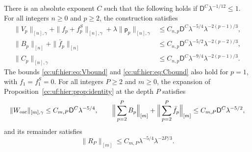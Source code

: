 \begin{theorem}\label{cc:uf:hier:thm:depth}
There is an absolute exponent $C$ such that the following holds if
$\mathsf D^C\lambda^{-1/12}\le1$. For all integers \(n\ge0\) and
\(p\ge2\), the construction satisfies
\begin{align}
 \|V_p\|_{[n],\gamma}+\|f_p+f_p^S\|_{[n],\gamma}
        +\lambda\|\mathsf p_p\|_{[n],\gamma}
 &\le C_{n,p}\mathsf D^C\lambda^{-5/4}\lambda^{-2(p-1)/3},
 \label{cc:uf:hier:eq:Vbound}\\
 \|B_p\|_{[n]}+\|\bar f_p\|_{[n]}
 &\le C_{n,p}\mathsf D^C\lambda^{-5/2}\lambda^{-2(p-2)/3},
 \label{cc:uf:hier:eq:Bbound}\\
 \|C_p\|_{[n],\gamma}
 &\le C_{n,p}\mathsf D^C\lambda^{-9/4}\lambda^{-2(p-1)/3}.
 \label{cc:uf:hier:eq:Cbound}
\end{align}
The bounds \eqref{cc:uf:hier:eq:Vbound} and
\eqref{cc:uf:hier:eq:Cbound} also hold for $p=1$, with $f_1=f_1^S=0$.
For all integers \(P\ge2\) and \(m\ge0\), the expansion of
Proposition~\ref{cc:uf:hier:prop:identity} at the depth $P$ satisfies
\begin{equation}\label{cc:uf:hier:eq:sum}
 \|W_{\rm osc}\|_{[m],\gamma}\le C_{m,P}\mathsf D^C\lambda^{-5/4},\qquad
 \Big\|\sum_{p=2}^PB_p\Big\|_{[m]}+\Big\|\sum_{p=2}^P\bar f_p\Big\|_{[m]}
 \le C_{m,P}\mathsf D^C\lambda^{-5/2},
\end{equation}
and its remainder satisfies
\begin{equation}\label{cc:uf:hier:eq:tail-est}
 \|R_P\|_{[m]}\le C_{m,P}\lambda^{-5/4}\lambda^{-2P/3}.
\end{equation}
\end{theorem}

